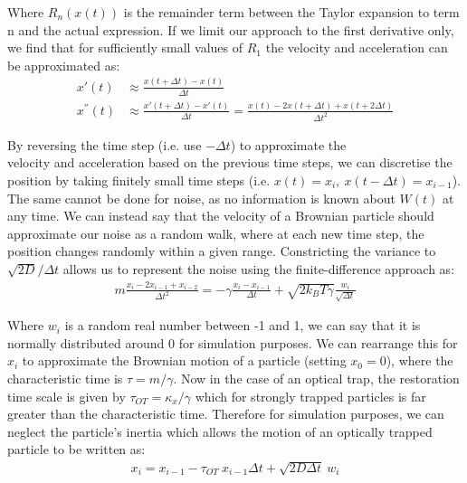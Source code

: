 Where $R_n(x(t))$ is the remainder term between the Taylor expansion to 
term n and the actual expression. If we limit our approach to the first 
derivative only, we find that for sufficiently small values of $R_1$ the 
velocity and acceleration can be approximated as:
\begin{align}
	x'(t) &\approx \frac{x(t+\Delta t)-x(t)}{\Delta t}
	\\
	x^{''}(t) &\approx \frac{x'(t+\Delta t)-x'(t)}{\Delta t} = \frac{x(t)-2x(t+\Delta t)+x(t+2\Delta t)}{\Delta t^2}
\end{align}

By reversing the time step (i.e. use $-\Delta t$) to approximate the \\
velocity and acceleration based on the previous time steps, we can 
discretise the position by taking finitely small  time steps (i.e. 
$x(t) = x_i,\ x(t-\Delta t) = x_{i-1}$). The same cannot be done for 
noise, as no information is known about $W(t)$ at any time. We 
can instead say that the velocity of a Brownian particle should 
approximate our noise as a random walk, where at each new time 
step, the position changes randomly within a given range. Constricting 
the variance to $\sqrt{2D}/\Delta t$ allows us to represent the 
noise using the finite-difference approach as:
\begin{align}
	m\frac{x_i-2x_{i-1}+x_{i-2}}{\Delta t^2} = -\gamma\frac{x_i-x_{i-1}}{\Delta t}+\sqrt{2k_BT\gamma}\frac{w_i}{\sqrt{\Delta t}}
\end{align}

Where $w_i$ is a random real number between -1 and 1, we can say that 
it is normally distributed around 0 for simulation purposes. We can 
rearrange this for $x_i$ to approximate the Brownian motion of a 
particle (setting $x_0=0$), where the characteristic time is $\tau = m/\gamma$. 
Now in the case of an optical trap, the restoration time scale is 
given by $\tau_{OT}=\kappa_x/\gamma$ which for strongly trapped particles 
is far greater than the characteristic time. Therefore for simulation 
purposes, we can neglect the particle's inertia which allows the motion 
of an optically trapped particle to be written as:
\begin{align}
	\label{eq:sim_langevin}
	x_i = x_{i-1} - \tau_{OT}\ x_{i-1}\Delta t + \sqrt{2D\Delta t}\ w_i
\end{align} 

